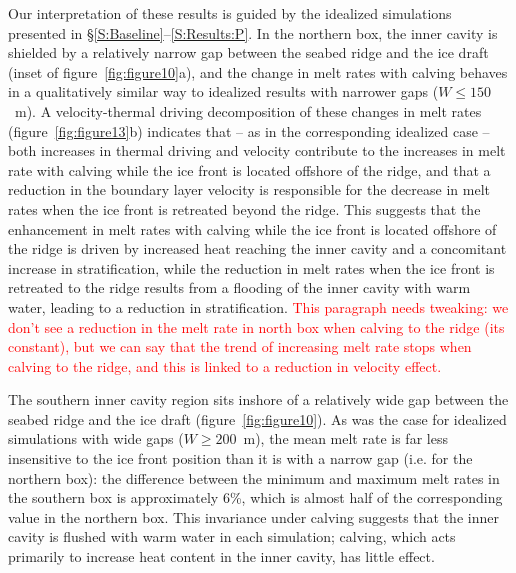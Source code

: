 \documentclass[draft]{agujournal2019}
\newcommand{\red}[1]{\textcolor{red}{#1}}
\begin{document}
 
Our interpretation of these results is guided by the idealized simulations presented in \S\ref{S:Baseline}--\ref{S:Results:P}. In the northern box, the inner cavity is shielded by a relatively narrow gap between the seabed ridge and the ice draft (inset of figure~\ref{fig:figure10}a), and the change in melt rates with calving behaves in a qualitatively similar way to idealized results with narrower gaps ($W\leq150$~m). A velocity-thermal driving decomposition of these changes in melt rates (figure~\ref{fig:figure13}b) indicates that -- as in the corresponding idealized case -- both increases in thermal driving and velocity contribute to the increases in melt rate with calving while the ice front is located offshore of the ridge, and that a reduction in the boundary layer velocity is responsible for the decrease in melt rates when the ice front is retreated beyond the ridge. This suggests that the enhancement in melt rates with calving while the ice front is located offshore of the ridge is driven by increased heat reaching the inner cavity and a concomitant increase in stratification, while the reduction in melt rates when the ice front is retreated to the ridge results from a flooding of the inner cavity with warm water, leading to a reduction in stratification. \red{This paragraph needs tweaking: we don't see a reduction in the melt rate in north box when calving to the ridge (its constant), but we can say that the trend of increasing melt rate stops when calving to the ridge, and this is linked to a reduction in velocity effect.}


The southern inner cavity region sits inshore of a relatively wide gap between the seabed ridge and the ice draft (figure~\ref{fig:figure10}). As was the case for idealized simulations with wide gaps ($W\geq200$~m), the mean melt rate is far less insensitive to the ice front position than it is with a narrow gap (i.e. for the northern box): the difference between the minimum and maximum melt rates in the southern box is approximately 6\%, which is almost half of the corresponding value in the northern box. This invariance under calving suggests that the inner cavity is flushed with warm water in each simulation; calving, which acts primarily to increase heat content in the inner cavity, has little effect.
\end{document}
